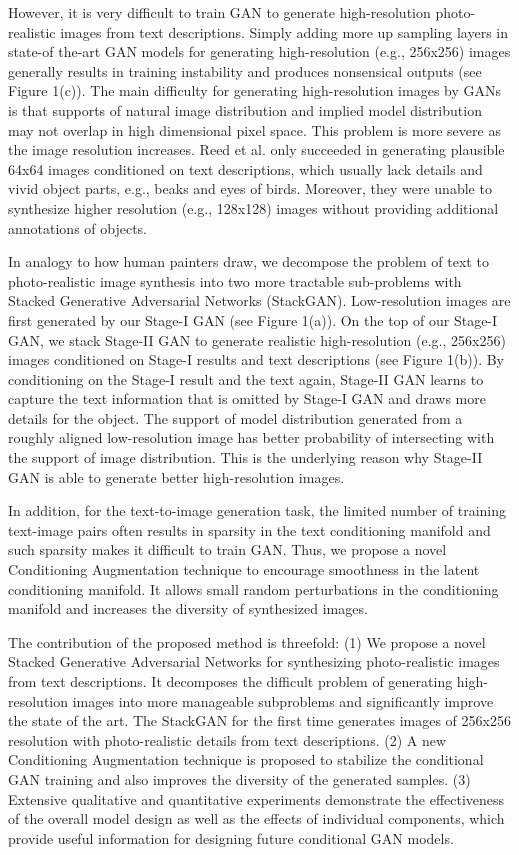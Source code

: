 \documentclass[a4paper,12pt,oneside]{article}
\begin{document}
However, it is very difficult to train GAN to generate high-resolution photo-realistic images from text descriptions. Simply adding more up sampling layers in state-of the-art GAN models for generating high-resolution (e.g., 256x256) images generally results in training instability and produces nonsensical outputs (see Figure 1(c)). The main difficulty for generating high-resolution images by GANs is that supports of natural image distribution and implied model distribution may not overlap in high dimensional pixel space. This problem is more severe as the image resolution increases. Reed et al. only succeeded in generating plausible 64x64 images conditioned on text descriptions, which usually lack details and vivid object parts, e.g., beaks and eyes of birds. Moreover, they were unable to synthesize higher resolution (e.g., 128x128) images without providing additional annotations of objects. 

In analogy to how human painters draw, we decompose the problem of text to photo-realistic image synthesis into two more tractable sub-problems with Stacked Generative Adversarial Networks (StackGAN). Low-resolution images are first generated by our Stage-I GAN (see Figure 1(a)). On the top of our Stage-I GAN, we stack Stage-II GAN to generate realistic high-resolution (e.g., 256x256) images conditioned on Stage-I results and text descriptions (see Figure 1(b)). By conditioning on the Stage-I result and the text again, Stage-II GAN learns to capture the text information that is omitted by Stage-I GAN and draws more details for the object. The support of model distribution generated from a roughly aligned low-resolution image has better probability of intersecting with the support of image distribution. This is the underlying reason why Stage-II GAN is able to generate better high-resolution images. 

In addition, for the text-to-image generation task, the limited number of training text-image pairs often results in sparsity in the text conditioning manifold and such sparsity makes it difficult to train GAN. Thus, we propose a novel Conditioning Augmentation technique to encourage smoothness in the latent conditioning manifold. It allows small random perturbations in the conditioning manifold and increases the diversity of synthesized images. 

The contribution of the proposed method is threefold: (1) We propose a novel Stacked Generative Adversarial Networks for synthesizing photo-realistic images from text descriptions. It decomposes the difficult 
problem of generating high-resolution images into more manageable subproblems and significantly improve the state of the art. The StackGAN for the first time generates images of 256x256 resolution with photo-realistic details from text descriptions. (2) A new Conditioning Augmentation technique is proposed to stabilize the conditional GAN training and also improves the diversity
of the generated samples. (3) Extensive qualitative and quantitative experiments demonstrate the effectiveness of the overall model design as well as the effects of individual components, which provide useful information for designing future conditional GAN models. 
\end{document}
